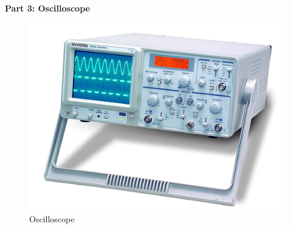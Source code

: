 \noindent \textbf{Part 3: Oscilloscope}
\begin{figure}[H]
    \centering
    \includegraphics[width=0.7\linewidth]{img/oscilloscope.png}
    \caption{Oscilloscope}
    \label{fig:oscilloscope}
\end{figure}

